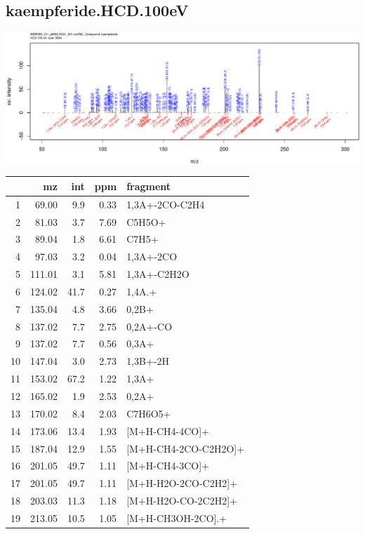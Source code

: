 \documentclass[]{article}
\begin{document}
\clearpage\subsection{kaempferide.HCD.100eV}
\includegraphics[width=\textwidth]{WEB350_files/figure-latex/unnamed-chunk-3-45}

\begin{table}[ht]
\centering
\begin{tabular}{rrrrl}
  \toprule
 & mz & int & ppm & fragment \\ 
  \midrule
1 & 69.00 & 9.9 & 0.33 & 1,3A+-2CO-C2H4 \\ 
  2 & 81.03 & 3.7 & 7.69 & C5H5O+ \\ 
  3 & 89.04 & 1.8 & 6.61 & C7H5+ \\ 
  4 & 97.03 & 3.2 & 0.04 & 1,3A+-2CO \\ 
  5 & 111.01 & 3.1 & 5.81 & 1,3A+-C2H2O \\ 
  6 & 124.02 & 41.7 & 0.27 & 1,4A.+ \\ 
  7 & 135.04 & 4.8 & 3.66 & 0,2B+ \\ 
  8 & 137.02 & 7.7 & 2.75 & 0,2A+-CO \\ 
  9 & 137.02 & 7.7 & 0.56 & 0,3A+ \\ 
  10 & 147.04 & 3.0 & 2.73 & 1,3B+-2H \\ 
  11 & 153.02 & 67.2 & 1.22 & 1,3A+ \\ 
  12 & 165.02 & 1.9 & 2.53 & 0,2A+ \\ 
  13 & 170.02 & 8.4 & 2.03 & C7H6O5+ \\ 
  14 & 173.06 & 13.4 & 1.93 & [M+H-CH4-4CO]+ \\ 
  15 & 187.04 & 12.9 & 1.55 & [M+H-CH4-2CO-C2H2O]+ \\ 
  16 & 201.05 & 49.7 & 1.11 & [M+H-CH4-3CO]+ \\ 
  17 & 201.05 & 49.7 & 1.11 & [M+H-H2O-2CO-C2H2]+ \\ 
  18 & 203.03 & 11.3 & 1.18 & [M+H-H2O-CO-2C2H2]+ \\ 
  19 & 213.05 & 10.5 & 1.05 & [M+H-CH3OH-2CO].+ \\ 

\end{tabular}
\end{table}
\end{document}
